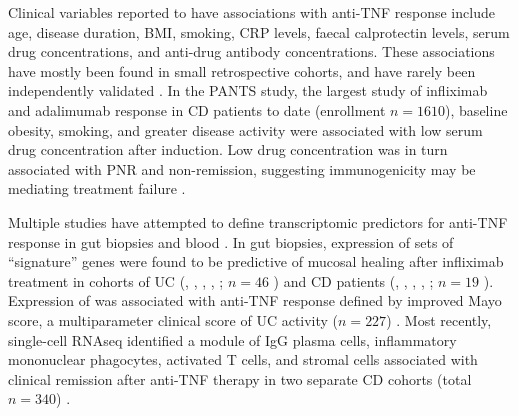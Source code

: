 Clinical variables reported to have associations with anti-\gls{TNF} response include age, disease duration, \gls{BMI}, smoking, \gls{CRP} levels, faecal calprotectin levels, serum drug concentrations, and anti-drug antibody concentrations.
These associations have mostly been found in small retrospective cohorts, and have rarely been independently validated \autocite{dhaens2011LondonPositionStatement,ding2016SystematicReviewPredicting,kopylov2016PredictingDurableResponse,flamant2018InflammatoryBowelDisease,digby-bell2019InterrogatingHostImmunity,noor2020PersonalisedMedicineCrohn}.
In the \gls{PANTS} study, the largest study of infliximab and adalimumab response in \gls{CD} patients to date (enrollment $n=1610$),
baseline obesity, smoking, and greater disease activity were associated with low serum drug concentration after induction.
Low drug concentration was in turn associated with \gls{PNR} and non-remission, suggesting immunogenicity may be mediating treatment failure \autocite{kennedy2019PredictorsAntiTNFTreatment}.

Multiple studies have attempted to define transcriptomic predictors for anti-\gls{TNF} response in gut biopsies and blood \autocite{digby-bell2019InterrogatingHostImmunity,noor2020PersonalisedMedicineCrohn}.
In gut biopsies, expression of sets of \enquote{signature} genes were found to be predictive of mucosal healing after infliximab treatment in cohorts of 
\gls{UC} (, , , , ; $n=46$ \autocite{arijs2009MucosalGeneSignatures}) 
and \gls{CD} patients (, , , , ; $n=19$ \autocite{arijs2010PredictiveValueEpithelial}).
Expression of  was associated with anti-\gls{TNF} response defined by improved Mayo score, a multiparameter clinical score of \gls{UC} activity ($n=227$) \autocite{west2017OncostatinDrivesIntestinal}.
Most recently, single-cell \gls{RNAseq} identified a module of IgG plasma cells, inflammatory mononuclear phagocytes, activated T cells, and stromal cells associated with clinical remission after anti-\gls{TNF} therapy in two separate \gls{CD} cohorts (total $n=340$) \autocite{martin2019SingleCellAnalysisCrohn}.

